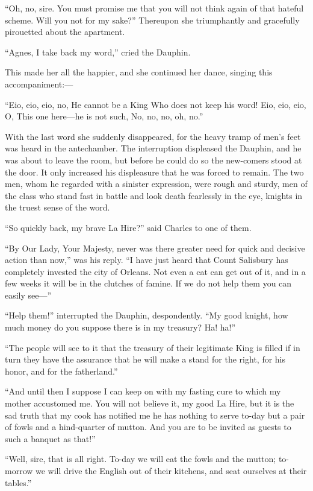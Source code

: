 ``Oh, no, sire. You must promise me that you will not think again of
that hateful scheme. Will you not for my sake?'' Thereupon she
triumphantly and gracefully pirouetted about the apartment.

``Agnes, I take back my word,'' cried the Dauphin.

This made her all the happier, and she continued her dance, singing this
accompaniment:---

``Eio, eio, eio, no, He cannot be a King Who does not keep his word!
Eio, eio, eio, O, This one here---he is not such, No, no, no, oh, no.''

With the last word she suddenly disappeared, for the heavy tramp of
men's feet was heard in the antechamber. The interruption displeased the
Dauphin, and he was about to leave the room, but before he could do so
the new-comers stood at the door. It only increased his displeasure that
he was forced to remain. The two men, whom he regarded with a sinister
expression, were rough and sturdy, men of the class who stand fast in
battle and look death fearlessly in the eye, knights in the truest sense
of the word.

``So quickly back, my brave La Hire?'' said Charles to one of them.

``By Our Lady, Your Majesty, never was there greater need for quick and
decisive action than now,'' was his reply. ``I have just heard that
Count Salisbury has completely invested the city of Orleans. Not even a
cat can get out of it, and in a few weeks it will be in the clutches of
famine. If we do not help them you can easily see---''

``Help them!'' interrupted the Dauphin, despondently. ``My good knight,
how much money do you suppose there is in my treasury? Ha! ha!''

``The people will see to it that the treasury of their legitimate King
is filled if in turn they have the assurance that he will make a stand
for the right, for his honor, and for the fatherland.''

``And until then I suppose I can keep on with my fasting cure to which
my mother accustomed me. You will not believe it, my good La Hire, but
it is the sad truth that my cook has notified me he has nothing to serve
to-day but a pair of fowls and a hind-quarter of mutton. And you are to
be invited as guests to such a banquet as that!''

``Well, sire, that is all right. To-day we will eat the fowls and the
mutton; to-morrow we will drive the English out of their kitchens, and
seat ourselves at their tables.''

